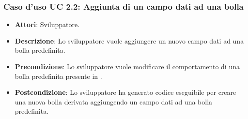 \subsubsection{Caso d'uso UC 2.2: Aggiunta di un campo dati ad una bolla}

\FloatBarrier
\begin{itemize}
\item\textbf{Attori}: Sviluppatore.
\item\textbf{Descrizione}: Lo sviluppatore vuole aggiungere un nuovo campo dati ad una bolla predefinita.
\item\textbf{Precondizione}: Lo sviluppatore vuole modificare il comportamento di una bolla predefinita presente in \progetto.
\item\textbf{Postcondizione}: Lo sviluppatore ha generato codice eseguibile per creare una nuova bolla derivata aggiungendo un campo dati ad una bolla predefinita.
\end{itemize}